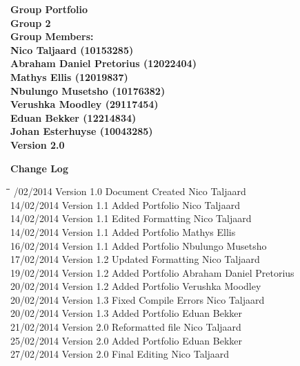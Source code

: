 \documentclass[12pt]{article}
\newcommand{\Title}{Group Portfolio} %
\begin{document}
	\begin{center}%
	
	  \LARGE \bf \Title \\[4em]
	  \LARGE {\bf Group 2}\\[1em]
	  \LARGE {\bf Group Members:}\\[2em]
	  \large
	      Nico Taljaard					(10153285) \\[1em]
	      Abraham Daniel Pretorius		(12022404) \\[1em]
	      Mathys Ellis					(12019837) \\[1em]
	      Nbulungo Musetsho				(10176382) \\[1em]
	      Verushka Moodley				(29117454) \\[1em]
	      Eduan Bekker					(12214834) \\[1em]
	      Johan Esterhuyse				(10043285) \\[9em]
	      {\bf Version 2.0}	    
	\end{center}%
	
	\newpage
	{\LARGE \bf Change Log}\\[2em]	
		\begin{tabbing}
			\hspace*{3cm}\=\hspace*{3cm}\=\hspace*{8cm}\=\hspace*{3cm} /02/2014 \> Version 1.0 \> Document Created 		\> Nico Taljaard\\
			14/02/2014 \> Version 1.1 \> Added Portfolio 		\> Nico Taljaard\\
			14/02/2014 \> Version 1.1 \> Edited Formatting 		\> Nico Taljaard\\
			14/02/2014 \> Version 1.1 \> Added Portfolio 		\> Mathys Ellis\\
			16/02/2014 \> Version 1.1 \> Added Portfolio 		\> Nbulungo Musetsho\\
			17/02/2014 \> Version 1.2 \> Updated Formatting		\> Nico Taljaard\\
			19/02/2014 \> Version 1.2 \> Added Portfolio 		\> Abraham Daniel Pretorius\\
			20/02/2014 \> Version 1.2 \> Added Portfolio 		\> Verushka Moodley\\
			20/02/2014 \> Version 1.3 \> Fixed Compile Errors 	\> Nico Taljaard\\
			20/02/2014 \> Version 1.3 \> Added Portfolio 		\> Eduan Bekker\\
			21/02/2014 \> Version 2.0 \> Reformatted file 		\> Nico Taljaard\\
			25/02/2014 \> Version 2.0 \> Added Portfolio 		\> Eduan Bekker\\
			27/02/2014 \> Version 2.0 \> Final Editing			\> Nico Taljaard\\
		\end{tabbing}
\end{document}
